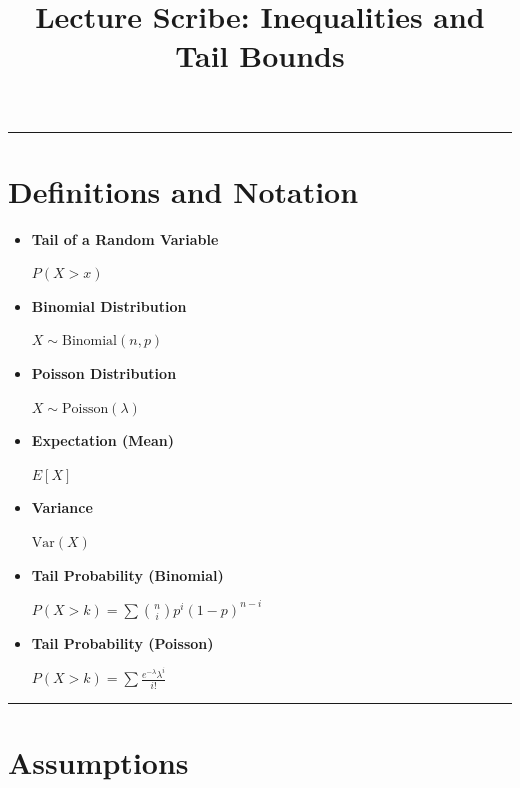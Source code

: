 \documentclass[12pt]{article}
\title{Lecture Scribe: Inequalities and Tail Bounds}
\date{}
\begin{document}
\maketitle
\noindent\rule{\textwidth}{0.4pt}
\section*{Definitions and Notation}
\begin{itemize}

    \item\textbf {Tail of a Random Variable}
    \begin{center}
        $P(X > x)$
    \end{center}

    \item\textbf {Binomial Distribution}
    \begin{center}
        $X \sim \text{Binomial}(n,p)$
    \end{center}

    \item \textbf{Poisson Distribution}
    \begin{center}
        $X \sim \text{Poisson}(\lambda)$
    \end{center}

    \item \textbf{Expectation (Mean)}
    \begin{center}
        $E[X]$
    \end{center}

    \item\textbf{Variance}
    \begin{center}
        $\mathrm{Var}(X)$
    \end{center}

    \item\textbf{ Tail Probability (Binomial)}
    \begin{center}
        $P(X > k) = \sum \binom{n}{i} p^i (1-p)^{n-i}$
    \end{center}

    \item \textbf {Tail Probability (Poisson)}
    \begin{center}
        $P(X > k) = \sum \frac{e^{-\lambda}\lambda^i}{i!}$
    \end{center}

\end{itemize}
\noindent\rule{\textwidth}{0.4pt}
\section*{Assumptions}
\end{document}
